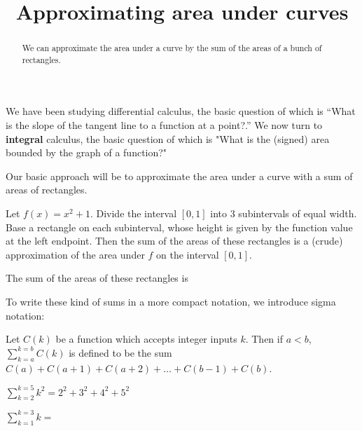 \documentclass{ximera}
\title{Approximating area under curves}
\begin{document}
\begin{abstract}
	We can approximate the area under a curve by the sum of the areas of a bunch of rectangles.	
\end{abstract}

\maketitle

We have been studying differential calculus, the basic question of
which is ``What is the slope of the tangent line to a function at a
point?.''  We now turn to \textbf{integral} calculus, the basic
question of which is "What is the (signed) area bounded by the graph
of a function?"

Our basic approach will be to approximate the area under a curve with
a sum of areas of rectangles.

\begin{image}
\end{image}

\begin{question}
  Let $f(x) = x^2+1$.  Divide the interval $[0,1]$ into $3$
  subintervals of equal width.  Base a rectangle on each subinterval,
  whose height is given by the function value at the left endpoint.
  Then the sum of the areas of these rectangles is a (crude)
  approximation of the area under $f$ on the interval $[0,1]$.

\begin{image}
\end{image}
	
  The sum of the areas of these rectangles is 
\end{question}

To write these kind of sums in a more compact notation, we introduce
sigma notation:

\begin{definition}
  Let $C(k)$ be a function which accepts integer inputs $k$.  Then if
  $a < b$, $\displaystyle\sum_{k=a}^{k=b} C(k)$ is defined to be the sum
  $C(a)+C(a+1)+C(a+2)+\dots +C(b-1)+C(b)$.
\end{definition}

\begin{example}
  $\displaystyle\sum_{k=2}^{k=5} k^2 = 2^2+3^2+4^2+5^2$
\end{example}

\begin{question}
	$\displaystyle\sum_{k=1}^{k=3} k = $
\end{question}
\end{document}
